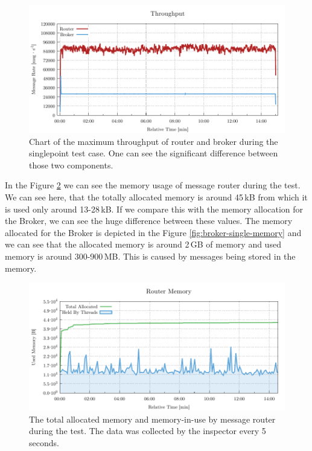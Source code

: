 \begin{figure}[H]
	\centering
	\includegraphics[width=1\linewidth]{obrazky-figures/charts/singlepoint-throughput.pdf}
	\caption{Chart of the maximum throughput of router and broker during the singlepoint test case. One can see the significant difference between those two components.}
	\label{fig:rate-single}
\end{figure}

In the Figure \ref{fig:router-single-memory} we can see the memory usage of message router during the test. We can see here, that the totally allocated memory is around 45\,kB from which it is used only around 13-28\,kB. If we compare this with the memory allocation for the Broker, we can see the huge difference between these values. The memory allocated for the Broker is depicted in the Figure \ref{fig:broker-single-memory} and we can see that the allocated memory is around 2\,GB of memory and used memory is around 300-900\,MB. This is caused by messages being stored in the memory.

\begin{figure}[H]
	\centering
	\includegraphics[width=1\linewidth]{obrazky-figures/charts/singlepoint-router-throughput-memory.pdf}
	\caption{The total allocated memory and memory-in-use by message router during the test. The data was collected by the inspector every 5\,seconds.}
	\label{fig:router-single-memory}
\end{figure}

